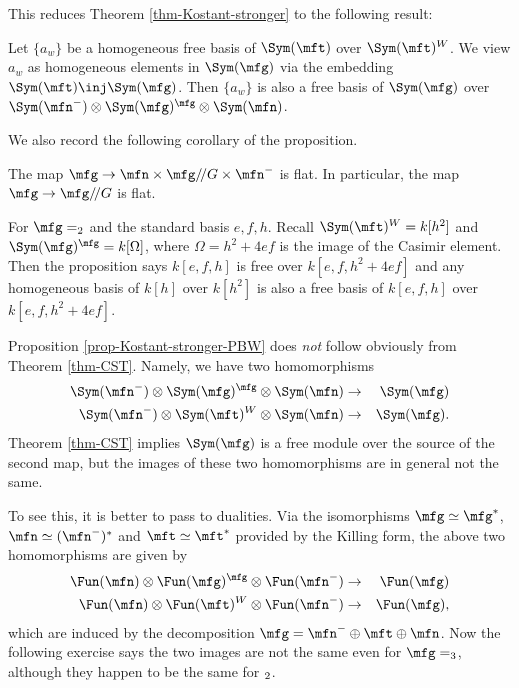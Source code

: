 	This reduces Theorem \ref{thm-Kostant-stronger} to the following result:

	\begin{prop}
		\label{prop-Kostant-stronger-PBW}
		Let $\{a_w\}$ be a homogeneous free basis of $\Sym(\mft)$ over $\Sym(\mft)^W$. We view $a_w$ as homogeneous elements in $\Sym(\mfg)$ via the embedding $\Sym(\mft) \inj \Sym(\mfg)$. Then $\{a_w\}$ is also a free basis of $\Sym(\mfg)$ over $\Sym(\mfn^-) \ot \Sym(\mfg)^\mfg \ot \Sym(\mfn)$.
	\end{prop}

	We also record the following corollary of the proposition.
	\begin{cor}
		The map $\mfg \to \mfn \mt \mfg/\!/G \mt \mfn^- $ is flat. In particular, the map $\mfg \to \mfg/\!/G$ is flat.
	\end{cor}
	

	\begin{exam}
		For $\mfg=\sl_2$ and the standard basis $e,f,h$. Recall $\Sym(\mft)^W = k[h^2]$ and $\Sym(\mfg)^{\mfg} = k[\Omega]$, where $\Omega = h^2 + 4ef$ is the image of the Casimir element. Then the proposition says $k[e,f,h]$ is free over $k[e,f,h^2+4ef]$ and any homogeneous basis of $k[h]$ over $k[h^2]$ is also a free basis of $k[e,f,h]$ over $k[e,f,h^2+4ef]$.
	\end{exam}

	
	\begin{warn}
		Proposition \ref{prop-Kostant-stronger-PBW} does \emph{not} follow obviously from Theorem \ref{thm-CST}. Namely, we have two homomorphisms
		\begin{eqnarray*}
			\Sym(\mfn^-) \ot \Sym(\mfg)^\mfg \ot \Sym(\mfn) &\to& \Sym(\mfg) \\
			\Sym(\mfn^-) \ot \Sym(\mft)^W \ot \Sym(\mfn) &\to& \Sym(\mfg).
		\end{eqnarray*}
		Theorem \ref{thm-CST} implies $\Sym(\mfg)$ is a free module over the source of the second map, but the images of these two homomorphisms are in general not the same. 

		To see this, it is better to pass to dualities. Via the isomorphisms $\mfg \simeq \mfg^*$, $\mfn \simeq (\mfn^-)^*$ and $\mft\simeq \mft^*$ provided by the Killing form, the above two homomorphisms are given by
		\begin{eqnarray}
			\label{eqn2}
			\Fun(\mfn) \ot \Fun(\mfg)^\mfg \ot \Fun(\mfn^-) &\to& \Fun(\mfg) \\
			\label{eqn3}
			\Fun(\mfn) \ot \Fun(\mft)^W \ot \Fun(\mfn^-) &\to& \Fun(\mfg),
		\end{eqnarray}
		which are induced by the decomposition $\mfg = \mfn^- \oplus \mft \oplus \mfn$. Now the following exercise says the two images are not the same even for $\mfg=\sl_3$, although they happen to be the same for $\sl_2$.
	\end{warn}

